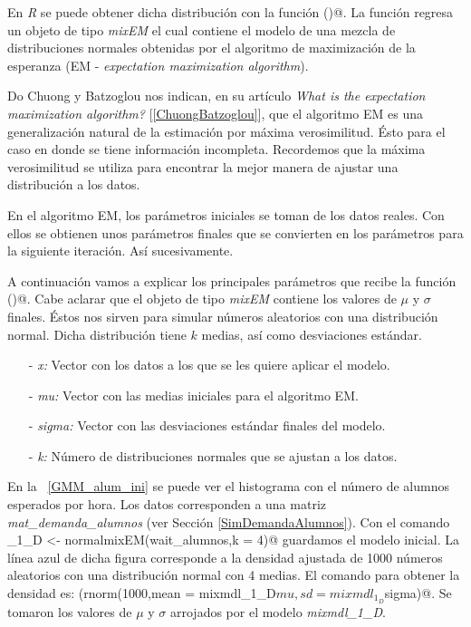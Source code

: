 En \textit{R} se puede obtener dicha distribución con la función \verb@normalmixEM()@. La función regresa un objeto de tipo \textit{mixEM} el cual contiene el modelo de una mezcla de distribuciones normales obtenidas por el algoritmo de maximización de la esperanza (EM - \textit{expectation maximization algorithm}).

Do Chuong y Batzoglou nos indican, en su artículo \textit{What is the expectation maximization algorithm?} [\ref{ChuongBatzoglou}], que el algoritmo EM es una generalización natural de la estimación por máxima verosimilitud. Ésto para el caso en donde se tiene información incompleta. Recordemos que la máxima verosimilitud se utiliza para encontrar la mejor manera de ajustar una distribución a los datos.

En el algoritmo EM, los parámetros iniciales se toman de los datos reales. Con ellos se obtienen unos parámetros finales que se convierten en los parámetros para la siguiente iteración. Así sucesivamente.

A continuación vamos a explicar los principales parámetros que recibe la función \verb@normalmixEM()@. Cabe aclarar que el objeto de tipo \textit{mixEM} contiene los valores de $\mu$ y $\sigma$ finales. Éstos nos sirven para simular números aleatorios con una distribución normal. Dicha distribución tiene $k$ medias, así como desviaciones estándar.

\begin{itemize}
\item[-] \textit{x: } Vector con los datos a los que se les quiere aplicar el modelo.

\item[-] \textit{mu: } Vector con las medias iniciales para el algoritmo EM.

\item[-] \textit{sigma: } Vector con las desviaciones estándar finales del modelo.

\item[-] \textit{k: } Número de distribuciones normales que se ajustan a los datos.
\end{itemize}

En la \figurename{~\ref{GMM_alum_ini}} se puede ver el histograma con el número de alumnos esperados por hora. Los datos corresponden a una matriz \textit{mat\_demanda\_alumnos} (ver Sección \ref{SimDemandaAlumnos}). Con el comando \verb@mixmdl_1_D <- normalmixEM(wait_alumnos,k = 4)@ guardamos el modelo inicial. La línea azul de dicha figura corresponde a la densidad ajustada de 1000 números aleatorios con una distribución normal con 4 medias. El comando para obtener la densidad es: \verb@density(rnorm(1000,mean = mixmdl_1_D$mu,sd = mixmdl_1_D$sigma)@. Se tomaron los valores de $\mu$ y $\sigma$ arrojados por el modelo \textit{mixmdl\_1\_D}.

